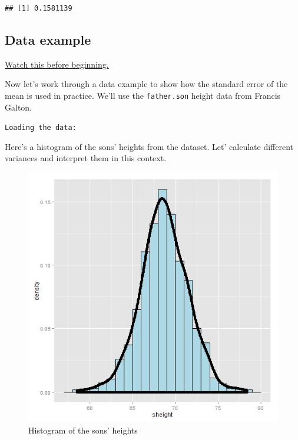 \documentclass[]{article}
\newenvironment{Shaded}{\begin{snugshade}}{\end{snugshade}}
\newcommand{\KeywordTok}[1]{\textcolor[rgb]{0.13,0.29,0.53}{\textbf{{#1}}}}
\newcommand{\StringTok}[1]{\textcolor[rgb]{0.31,0.60,0.02}{{#1}}}
\newcommand{\NormalTok}[1]{{#1}}
\begin{document}
\begin{verbatim}
## [1] 0.1581139
\end{verbatim}

\subsection{Data example}\label{data-example}

\href{http://youtu.be/Lm2DMVyZVxk?list=PLpl-gQkQivXiBmGyzLrUjzsblmQsLtkzJ}{Watch
this before beginning.}

Now let's work through a data example to show how the standard error of
the mean is used in practice. We'll use the \texttt{father.son} height
data from Francis Galton.

\vspace{1pc}

\verb;Loading the data:;

\begin{Shaded}
\end{Shaded}

Here's a histogram of the sons' heights from the dataset. Let' calculate
different variances and interpret them in this context.

\begin{figure}[htbp]
\centering
\includegraphics{LeanPub/images/fatherSon-1.png}
\caption{Histogram of the sons' heights}
\end{figure}
\end{document}
